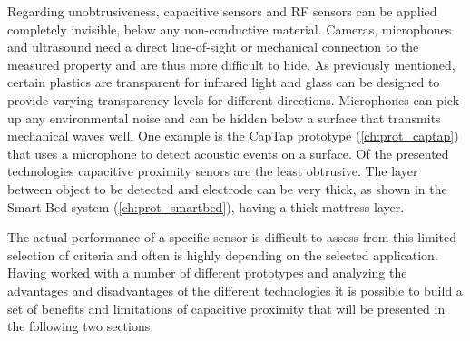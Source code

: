 Regarding unobtrusiveness, capacitive sensors and RF sensors can be applied completely invisible, below any non-conductive material. Cameras, microphones and ultrasound need a direct line-of-sight or mechanical connection to the measured property and are thus more difficult to hide. As previously mentioned, certain plastics are transparent for infrared light and glass can be designed to provide varying transparency levels for different directions. Microphones can pick up any environmental noise and can be hidden below a surface that transmits mechanical waves well. One example is the CapTap prototype (\ref{ch:prot_captap}) that uses a microphone to detect acoustic events on a surface. Of the presented technologies capacitive proximity senors are the least obtrusive. The layer between object to be detected and electrode can be very thick, as shown in the Smart Bed system (\ref{ch:prot_smartbed}), having a thick mattress layer.

The actual performance of a specific sensor is difficult to assess from this limited selection of criteria and often is highly depending on the selected application. Having worked with a number of different prototypes and analyzing the advantages and disadvantages of the different technologies it is possible to build a set of benefits and limitations of capacitive proximity that will be presented in the following two sections.
